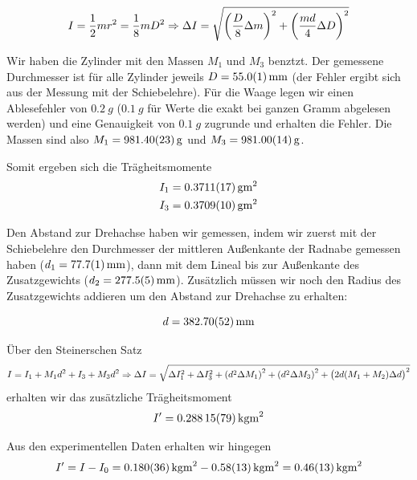 \documentclass[a4paper,german,12pt,smallheadings]{scrartcl}
\begin{document}
\begin{equation}
  I = \frac{1}{2} m r^2 = \frac{1}{8} mD^2 \Rightarrow
  \Delta I = \sqrt{\del{\frac{D}{8} \Delta m}^2 + \del{\frac{md}{4} \Delta D}^2}
\end{equation}

Wir haben die Zylinder mit den Massen $M_1$ und $M_3$ benztzt. Der gemessene
Durchmesser ist für alle Zylinder jeweils $D = \SI{55.0+-0.1}{mm}$ (der Fehler
ergibt sich aus der Messung mit der Schiebelehre). Für die Waage legen wir
einen Ablesefehler von $\SI{0.2}{g}$ ($\SI{0.1}{g}$ für Werte die exakt bei
ganzen Gramm abgelesen werden) und eine Genauigkeit von $\SI{0.1}{g}$ zugrunde
und erhalten die Fehler. Die Massen sind also $M_1 = \SI{981.4+-0.23}{g}$ und $M_3 =
\SI{981.0+-0.14}{g}$.

Somit ergeben sich die Trägheitsmomente
\begin{align*}
  I_1 &= \SI{0.3711+-0.0017}{g m^2} \\
  I_3 &= \SI{0.3709+-0.0010}{g m^2}
\end{align*}

Den Abstand zur Drehachse haben wir gemessen, indem wir zuerst mit der
Schiebelehre den Durchmesser der mittleren Außenkante der Radnabe gemessen
haben ($d_1 = \SI{77.7+-0.1}{mm}$), dann mit dem Lineal bis zur Außenkante des
Zusatzgewichts ($d_2 = \SI{277.5+-0.5}{mm}$). Zusätzlich müssen wir noch den
Radius des Zusatzgewichts addieren um den Abstand zur Drehachse zu erhalten:

\begin{equation}
  d = \SI{382.70\pm0.52}{mm}
\end{equation}

Über den Steinerschen Satz
\begin{equation}
  I = I_1 + M_1 d^2 + I_3 + M_3 d^2 \Rightarrow
  \Delta I = \sqrt{\Delta I_1^2 + \Delta I_3^2 + \del{d^2 \Delta M_1}^2 +
  \del{d^2 \Delta M_3}^2 + \del{2d (M_1+M_2) \Delta d}^2}
\end{equation}
erhalten wir das zusätzliche Trägheitsmoment
\begin{equation}
  I' = \SI{0.28815+-0.00079}{kg m^2}
\end{equation}

Aus den experimentellen Daten erhalten wir hingegen
\begin{equation}
  I' = I - I_0 = \SI{0.180+-0.036}{kg m^2} - \SI{0.58+-0.13}{kg m^2} = \SI{0.46+-0.13}{kg m^2}
\end{equation}
\end{document}
